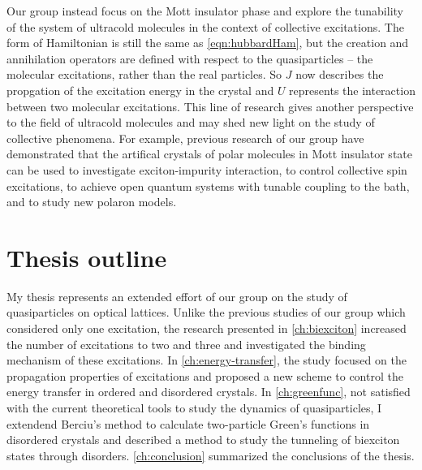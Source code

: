 Our group instead focus on the Mott insulator phase and explore the tunability of the system of ultracold molecules in the 
context of collective excitations. The form of Hamiltonian is still the same as \autoref{eqn:hubbardHam}, but the creation
and annihilation operators are defined with respect to the quasiparticles -- the molecular excitations, rather than the real 
particles.  So $J$ now describes the propgation of the excitation energy in the crystal and $U$ represents the interaction
between two molecular excitations. This line of research gives another perspective to the field of ultracold molecules and
may shed new light on the study of collective phenomena. For example, previous research of our group have demonstrated
that the artifical crystals of polar molecules in Mott insulator state can be used to investigate exciton-impurity interaction\cite{felipe},
to control collective spin excitations\cite{perez-rios2010}, to achieve open quantum systems with tunable coupling to the bath\cite{felipe-polarons}, and to study new polaron models\cite{felipe-arxive-polaron}. 


\section{Thesis outline}
\label{sec:outline}

My thesis represents an extended effort of our group on the study of quasiparticles on optical lattices. Unlike the previous 
studies of our group which considered  only one excitation, the research presented in \autoref{ch:biexciton} increased the number of 
excitations to two and three and investigated the binding mechanism of these excitations. In \autoref{ch:energy-transfer}, 
the study focused on the propagation properties of excitations and proposed a new scheme to control the energy transfer 
in 
ordered and disordered crystals. In \autoref{ch:greenfunc}, not satisfied with the current theoretical tools to study the 
dynamics of quasiparticles, I extendend Berciu's method\cite{Berciu2010, Berciu2011, Berciu2012} to calculate 
two-particle 
Green's functions in disordered crystals and described a method to study the tunneling of biexciton states through 
disorders. \autoref{ch:conclusion} summarized the conclusions of the thesis. 


